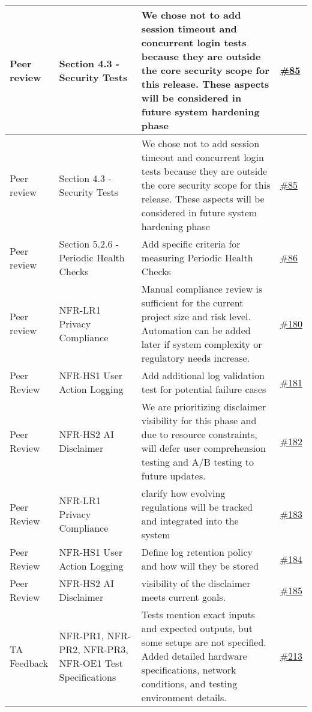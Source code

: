 \documentclass{article}
\begin{document}
\begin{longtable}{| p{} | p{} | p{} | p{} |}
    \hline
    Peer review & Section 4.3 - Security Tests & We chose not to add session timeout and concurrent login tests because they are outside the core security scope for this release. These aspects will be considered in future system hardening phase & \href{https://github.com/RezaJodeiri/CXR-Capstone/issues/85}{\#85} \\
    \hline
    Peer review &  Section 4.3 - Security Tests & We chose not to add session timeout and concurrent login tests because they are outside the core security scope for this release. These aspects will be considered in future system hardening phase & \href{https://github.com/RezaJodeiri/CXR-Capstone/issues/85}{\#85}\\
    \hline
    Peer review & Section 5.2.6 - Periodic Health Checks & Add specific criteria for measuring Periodic Health Checks &  \href{https://github.com/RezaJodeiri/CXR-Capstone/issues/86}{\#86}\\
    \hline
    Peer review & NFR-LR1 Privacy Compliance & Manual compliance review is sufficient for the current project size and risk level. Automation can be added later if system complexity or regulatory needs increase. & \href{https://github.com/RezaJodeiri/CXR-Capstone/issues/180}{\#180}\\
    \hline
    Peer Review & NFR-HS1 User Action Logging & Add additional log validation test for potential failure cases & \href{https://github.com/RezaJodeiri/CXR-Capstone/issues/181}{\#181}\\
    \hline
    Peer Review & NFR-HS2 AI Disclaimer & We are prioritizing disclaimer visibility for this phase and due to resource constraints, will defer user comprehension testing and A/B testing to future updates. & \href{https://github.com/RezaJodeiri/CXR-Capstone/issues/182}{\#182}\\
    \hline 
    Peer Review & NFR-LR1 Privacy Compliance & clarify how evolving regulations will be tracked and integrated into the system & \href{https://github.com/RezaJodeiri/CXR-Capstone/issues/183}{\#183}\\
    \hline
    Peer Review & NFR-HS1 User Action Logging & Define log retention policy and how will they be stored & \href{https://github.com/RezaJodeiri/CXR-Capstone/issues/184}{\#184}\\
    \hline 
    Peer Review & NFR-HS2 AI Disclaimer & visibility of the disclaimer meets current goals. & \href{https://github.com/RezaJodeiri/CXR-Capstone/issues/185}{\#185}\\
    \hline
    TA Feedback & NFR-PR1, NFR-PR2, NFR-PR3, NFR-OE1 Test Specifications & Tests mention exact inputs and expected outputs, but some setups are not specified. Added detailed hardware specifications, network conditions, and testing environment details. & \href{https://github.com/RezaJodeiri/CXR-Capstone/issues/213#issue-2973794790}{\#213}\\

\end{longtable}
\end{document}
